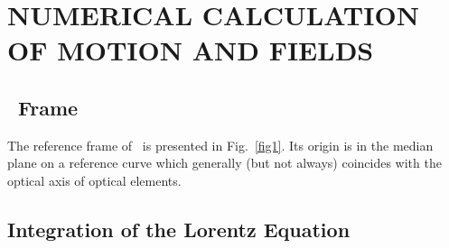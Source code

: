 \newpage
\clearemptydoublepage

\section{NUMERICAL CALCULATION OF MOTION AND FIELDS}\label{sec2} %


\subsection{\zgoubi\ Frame} \label{sec2.1}   %

The reference frame of \zgou\  is presented in Fig.~\ref{fig1}.  
Its origin is in the median plane on a reference curve which generally (but not always) coincides with the optical 
axis of optical elements. 

\subsection{Integration of the Lorentz Equation} \label{sec2.2}%

